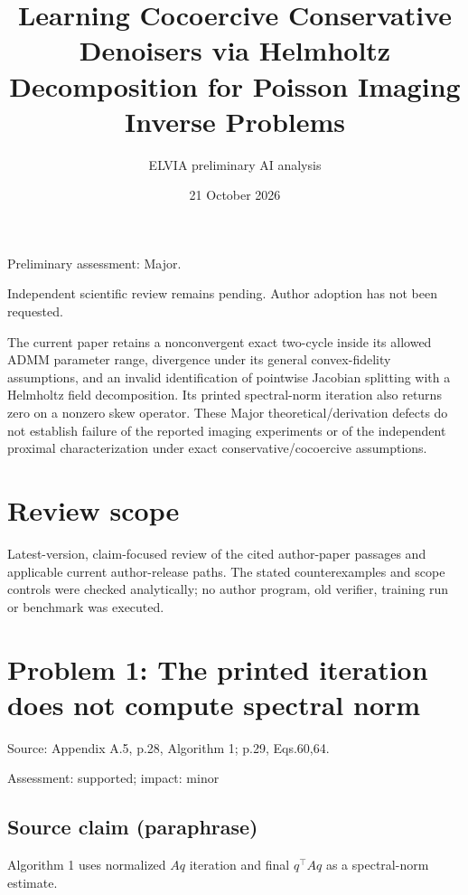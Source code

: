 \documentclass[11pt]{article}
\begin{document}
\title{Learning Cocoercive Conservative Denoisers via Helmholtz Decomposition for Poisson Imaging Inverse Problems}

\author{ELVIA preliminary AI analysis}\date{21 October 2026}\maketitle

Preliminary assessment: Major.\par

Independent scientific review remains pending. Author adoption has not been requested.

The current paper retains a nonconvergent exact two-cycle inside its allowed ADMM parameter range, divergence under its general convex-fidelity assumptions, and an invalid identification of pointwise Jacobian splitting with a Helmholtz field decomposition. Its printed spectral-norm iteration also returns zero on a nonzero skew operator. These Major theoretical/derivation defects do not establish failure of the reported imaging experiments or of the independent proximal characterization under exact conservative/cocoercive assumptions.

\section*{Review scope}

Latest-version, claim-focused review of the cited author-paper passages and applicable current author-release paths. The stated counterexamples and scope controls were checked analytically; no author program, old verifier, training run or benchmark was executed.

\section*{Problem 1: The printed iteration does not compute spectral norm}

Source: Appendix A.5, p.28, Algorithm 1; p.29, Eqs.60,64.

Assessment: supported; impact: minor

\subsection*{Source claim (paraphrase)}

Algorithm 1 uses normalized \(Aq\) iteration and final \(q^\top Aq\) as a spectral-norm estimate.
\end{document}
